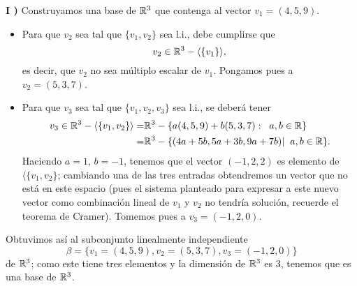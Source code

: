 \textbf{I )} Construyamos una base de $\mathbb{R}^{3}$ que contenga al vector $v_{1} = (4, 5, 9)$.
\begin{itemize}
	\item Para que $v_{2}$ sea tal que $\{ v_{1}, v_{2} \}$ sea l.i.,
	debe cumplirse que 
	\[
	v_{2} \in \mathbb{R}^{3} - \langle \{ v_{1} \} \rangle, 
	\]
	es decir, que $v_{2}$ no sea múltiplo escalar de $v_{1}$. Pongamos pues
	a $v_{2} = (5, 3, 7)$.
	\item Para que $v_{3}$ sea tal que $\{ v_{1}, v_{2}, v_{3} \}$ 
	sea l.i., se deberá tener 
	\begin{align*}
	v_{3} \in \mathbb{R}^{3} - \langle \{ v_{1}, v_{2} \} \rangle
	= &
	\mathbb{R}^{3} - \{ a(4, 5, 9) + b (5, 3, 7) : \hspace{0.2cm} a, b \in \mathbb{R} \} \\
	= & 
	\mathbb{R}^{3} - \{ (4a+5b, 5a+3b, 9a+7b)  | \hspace{0.2cm} a, b \in \mathbb{R} \}.
	\end{align*}
	Haciendo $a = 1$, $b = -1$, tenemos que el vector 
	$(-1, 2, 2)$ es elemento de $\langle \{ v_{1}, v_{2} \}$; cambiando
	una de las tres entradas obtendremos un vector que no está en este
	espacio (pues el sistema planteado para expresar a este nuevo vector
	como combinación lineal de $v_{1}$ y $v_{2}$ no tendría solución,
	recuerde el teorema de Cramer). Tomemos pues a $v_{3} = (-1, 2, 0)$.
\end{itemize}
Obtuvimos así al subconjunto linealmente independiente
\[
\beta = 
\{ v_{1} = (4, 5, 9), v_{2} = (5, 3, 7), v_{3} = (-1, 2, 0) \}
\]
de $\mathbb{R}^{3}$; como este tiene tres elementos y la dimensión de 
$\mathbb{R}^{3}$ es $3$, tenemos que es una base de $\mathbb{R}^{3}$.

